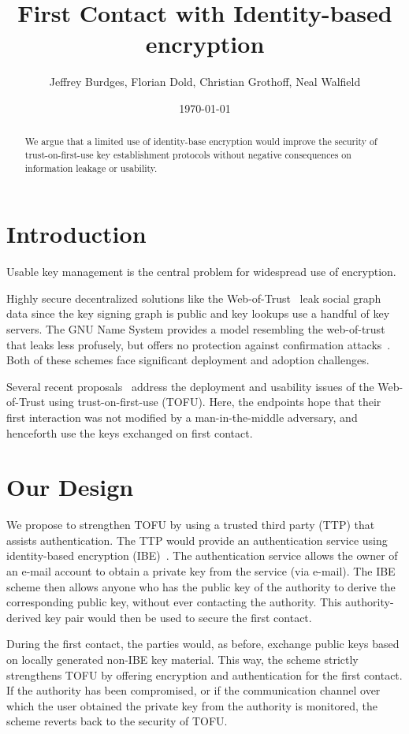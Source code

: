 \documentclass[twoside,letterpaper]{sig-alternate}
\title{First Contact with Identity-based encryption}
\author{Jeffrey Burdges, Florian Dold, Christian Grothoff, Neal Walfield}
\date{\today}
\begin{document}
\maketitle


\begin{abstract}
We argue that a limited use of identity-base encryption would improve
the security of trust-on-first-use key establishment protocols without
negative consequences on information leakage or usability.
\end{abstract}


\section{Introduction}

Usable key management is the central problem for widespread use
of encryption.

Highly secure decentralized solutions like the Web-of-Trust~\cite{wot}
leak social graph data since the key signing graph is public and key
lookups use a handful of key servers.  The GNU Name System provides a
model resembling the web-of-trust that leaks less profusely, but
offers no protection against confirmation attacks~\cite{gns}.  Both
of these schemes face significant deployment and adoption challenges.

Several recent proposals~\cite{openpgp-tofu,pep} address the
deployment and usability issues of the Web-of-Trust using
trust-on-first-use (TOFU).  Here, the endpoints hope that their first
interaction was not modified by a man-in-the-middle adversary, and
henceforth use the keys exchanged on first contact.

\section{Our Design}

We propose to strengthen TOFU by using a trusted third party (TTP)
that assists authentication.  The TTP would provide an authentication
service using identity-based encryption (IBE)~\cite{ibe}.  The
authentication service allows the owner of an e-mail account to
obtain a private key from the service (via e-mail).  The IBE scheme
then allows anyone who has the public key of the authority to derive
the corresponding public key, without ever contacting the authority.
This authority-derived key pair would then be used to secure the
first contact.

During the first contact, the parties would, as before, exchange
public keys based on locally generated non-IBE key material.  This
way, the scheme strictly strengthens TOFU by offering encryption
and authentication for the first contact.  If the authority has been
compromised, or if the communication channel over which the user
obtained the private key from the authority is monitored, the scheme
reverts back to the security of TOFU.
\end{document}

